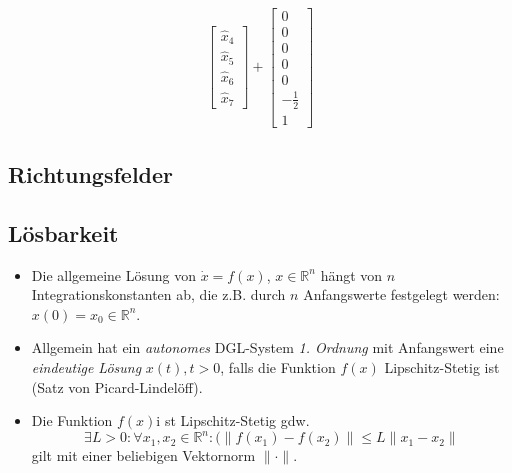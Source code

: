 \documentclass[a4paper, 11pt, accentcolor = tud3b]{tudreport}
\begin{document}
\begin{itemize}
\begin{align*}
\begin{bmatrix}
							        \hat{x} _ 4 \\
							        \hat{x} _ 5 \\
							        \hat{x} _ 6 \\
							        \hat{x} _ 7
						        \end{bmatrix}
						        +
						        \begin{bmatrix}
							        0 \\
							        0 \\
							        0 \\
							        0 \\
							        0 \\
							        -\frac{1}{2} \\
							        1
						        \end{bmatrix}
					        \end{align*}
	                \end{itemize}

			\subsection{Richtungsfelder} %

            \subsection{Lösbarkeit} %
                \begin{itemize}
                	\item Die allgemeine Lösung von \( \dot{x} = f(x) \), \( x \in \mathbb{R} ^ n \) hängt von \( n \) Integrationskonstanten ab, die z.B. durch \( n \) Anfangswerte festgelegt werden: \( x(0) = x _ 0 \in \mathbb{R} ^ n \).
                	\item Allgemein hat ein \textit{autonomes} DGL-System \textit{1. Ordnung} mit Anfangswert eine \textit{eindeutige Lösung} \( x(t), t > 0 \), falls die Funktion \( f(x) \) Lipschitz-Stetig ist (Satz von Picard-Lindelöff).
                	\item Die Funktion \( f(x) \)i st Lipschitz-Stetig gdw. \[ \exists L > 0 : \forall x _ 1, x _ 2 \in \mathbb{R} ^ n : (\lVert f(x _ 1) - f(x _ 2) \rVert \leq L \lVert x _ 1 - x _ 2 \rVert \] gilt mit einer beliebigen Vektornorm \( \lVert \cdot \rVert \).
                \end{itemize}
\end{document}
